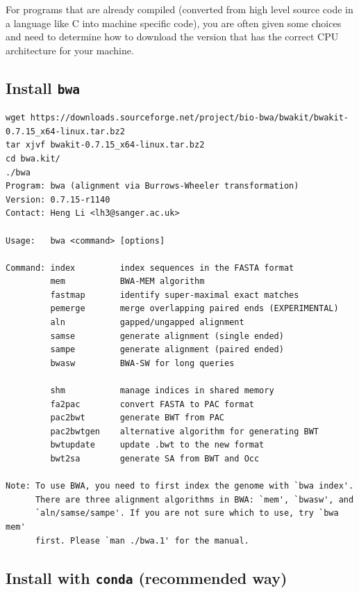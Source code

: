 \documentclass[]{book}
\begin{document}
For programs that are already compiled (converted from high level source code in a language like C into machine specific code), you are often given some choices and need to determine how to download the version that has the correct CPU architecture for your machine.

\hypertarget{install-bwa-1}{%
\subsection{\texorpdfstring{Install \texttt{bwa}}{Install bwa}}\label{install-bwa-1}}

\begin{verbatim}
wget https://downloads.sourceforge.net/project/bio-bwa/bwakit/bwakit-0.7.15_x64-linux.tar.bz2
tar xjvf bwakit-0.7.15_x64-linux.tar.bz2
cd bwa.kit/
./bwa
Program: bwa (alignment via Burrows-Wheeler transformation)
Version: 0.7.15-r1140
Contact: Heng Li <lh3@sanger.ac.uk>

Usage:   bwa <command> [options]

Command: index         index sequences in the FASTA format
         mem           BWA-MEM algorithm
         fastmap       identify super-maximal exact matches
         pemerge       merge overlapping paired ends (EXPERIMENTAL)
         aln           gapped/ungapped alignment
         samse         generate alignment (single ended)
         sampe         generate alignment (paired ended)
         bwasw         BWA-SW for long queries

         shm           manage indices in shared memory
         fa2pac        convert FASTA to PAC format
         pac2bwt       generate BWT from PAC
         pac2bwtgen    alternative algorithm for generating BWT
         bwtupdate     update .bwt to the new format
         bwt2sa        generate SA from BWT and Occ

Note: To use BWA, you need to first index the genome with `bwa index'.
      There are three alignment algorithms in BWA: `mem', `bwasw', and
      `aln/samse/sampe'. If you are not sure which to use, try `bwa mem'
      first. Please `man ./bwa.1' for the manual.
\end{verbatim}

\hypertarget{install-with-conda-recommended-way}{%
\subsection{\texorpdfstring{Install with \texttt{conda} (recommended way)}{Install with conda (recommended way)}}\label{install-with-conda-recommended-way}}
\end{document}
